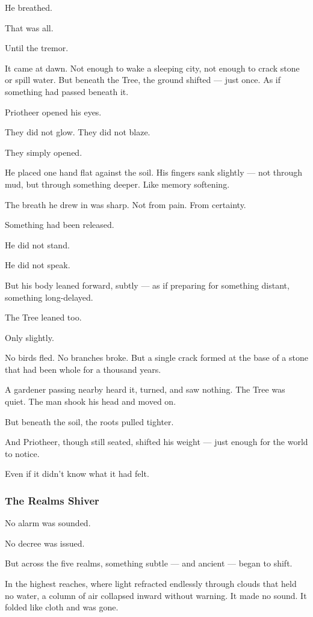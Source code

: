 \documentclass[12pt]{article}
\begin{document}
He breathed.

That was all.

Until the tremor.

It came at dawn. Not enough to wake a sleeping city, not enough to crack stone or spill water. But beneath the Tree, the ground shifted — just once. As if something had passed beneath it.

Priotheer opened his eyes.

They did not glow. They did not blaze.

They simply opened.

He placed one hand flat against the soil. His fingers sank slightly — not through mud, but through something deeper. Like memory softening.

The breath he drew in was sharp. Not from pain. From certainty.

Something had been released.

He did not stand.

He did not speak.

But his body leaned forward, subtly — as if preparing for something distant, something long-delayed.

The Tree leaned too.

Only slightly.

No birds fled. No branches broke. But a single crack formed at the base of a stone that had been whole for a thousand years.

A gardener passing nearby heard it, turned, and saw nothing. The Tree was quiet. The man shook his head and moved on.

But beneath the soil, the roots pulled tighter.

And Priotheer, though still seated, shifted his weight — just enough for the world to notice.

Even if it didn’t know what it had felt.



\dotfill

\subsubsection*{The Realms Shiver}

No alarm was sounded.

No decree was issued.

But across the five realms, something subtle — and ancient — began to shift.

In the highest reaches, where light refracted endlessly through clouds that held no water, a column of air collapsed inward without warning. It made no sound. It folded like cloth and was gone.
\end{document}
